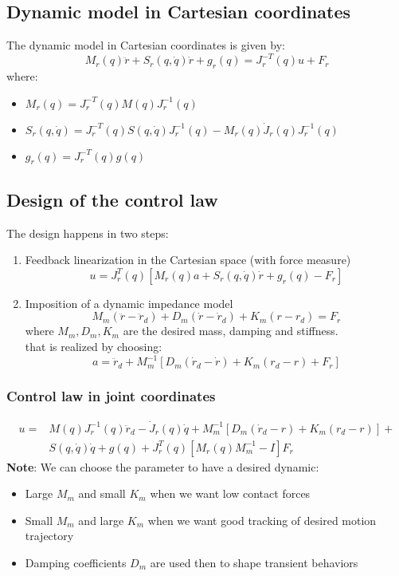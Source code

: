 \documentclass[a4paper,12pt]{article}
\begin{document}
\subsection{Dynamic model in Cartesian coordinates}
The dynamic model in Cartesian coordinates is given by:
\begin{equation}\label{eq:dynamic model in Cartesian coordinates}
    M_r(q)\ddot{r} + S_r(q,\dot{q})\dot{r} + g_r(q) = J_r^{-T}(q)u+F_r
\end{equation}
where:
\begin{itemize}
    \item $M_r(q)=J_r^{-T}(q)M(q)J_r^{-1}(q)$
    \item $S_r(q,\dot{q})=J_r^{-T}(q)S(q,\dot{q})J_r^{-1}(q) - M_r(q)\dot{J}_r(q)J_r^{-1}(q)$
    \item $g_r(q)=J_r^{-T}(q)g(q)$
\end{itemize}
\subsection{Design of the control law}
The design happens in two steps:
\begin{enumerate}
\item Feedback linearization in the Cartesian space
 (with force measure) \begin{equation}
 u=J_r^T(q)[M_r(q)a+ S_r(q,\dot{q})\dot{r} + g_r(q) - F_r]
 \end{equation}
\item Imposition of a dynamic impedance model \begin{equation}
M_m(\ddot{r}-\ddot{r}_d) + D_m(\dot{r}-\dot{r}_d) + K_m(r-r_d) = F_r
\end{equation}
where $M_m, D_m, K_m$ are the desired mass, damping and stiffness.\\
that is realized by choosing: \begin{equation}
a = \ddot{r}_d + M_m^{-1}[D_m(\dot{r}_d-\dot{r})+K_m(r_d-r)+F_r]
\end{equation}
\end{enumerate}
\subsubsection{Control law in joint coordinates}
\begin{equation}
    \begin{split}
u = & M(q)J_r^{-1}(q){\ddot{r}_d-\dot{J}_r(q)\dot{q}+M_m^{-1}[D_m(\dot{r}_d-r)+K_m(r_d-r)]}+ \\
&S(q,\dot{q})\dot{q}+g(q)+J_r^T(q)[M_r(q)M_m^{-1}-I]F_r
    \end{split}
\end{equation}
\textbf{Note}: We can choose the parameter to have a desired dynamic:
\begin{itemize}
    \item Large $M_m$  and small $K_m$ when we want low contact forces
    \item Small $M_m$ and large $K_m$ when we want good tracking of desired 
    motion trajectory
    \item Damping coefficients $D_m$ are used then to shape transient behaviors
\end{itemize}
\end{document}
